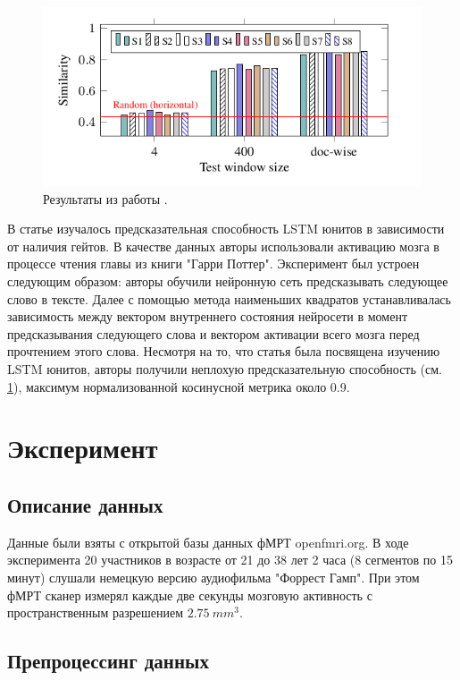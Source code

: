 \documentclass[pdftex,ptm,12pt,a4paper]{report}
\theoremstyle{definition}
\begin{document}
\begin{figure}[h]
\includegraphics[scale=0.7]{images/neural_nets.png}
\centering
\caption{Результаты из работы \cite{qian2016bridging}.}
\label{qian_res}
\end{figure}

В статье \cite{qian2016bridging} изучалось предсказательная способность LSTM юнитов в зависимости от наличия гейтов. В качестве данных авторы использовали активацию мозга в процессе чтения главы из книги "Гарри Поттер". Эксперимент был устроен следующим образом: авторы обучили нейронную сеть предсказывать следующее слово в тексте. Далее с помощью метода наименьших квадратов устанавливалась зависимость между вектором внутреннего состояния нейросети в момент предсказывания следующего слова и вектором активации всего мозга перед прочтением этого слова. Несмотря на то, что статья была посвящена изучению LSTM юнитов, авторы получили неплохую предсказательную способность (см. \ref{qian_res}), максимум нормализованной косинусной метрика около 0.9.


\chapter{Эксперимент}

\section{Описание данных}

Данные были взяты с открытой базы данных фМРТ openfmri.org. В ходе эксперимента 20 участников в возрасте от 21 до 38 лет 2 часа (8 сегментов по 15 минут) слушали немецкую версию аудиофильма "Форрест Гамп". При этом фМРТ сканер измерял каждые две секунды мозговую активность с пространственным разрешением $2.75\ mm^3$.

\section{Препроцессинг данных}
\end{document}
